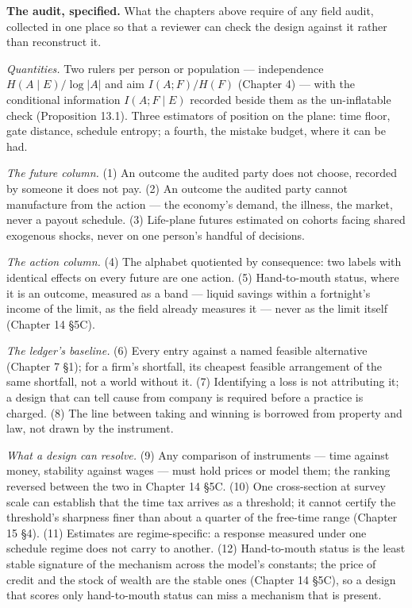 \begin{panelmach}

\textbf{The audit, specified.} What the chapters above require of any
field audit, collected in one place so that a reviewer can check the
design against it rather than reconstruct it.

\emph{Quantities.} Two rulers per person or population --- independence
\(H(A \mid E)/\log |A|\) and aim \(I(A;F)/H(F)\) (Chapter 4) --- with the conditional
information \(I(A;F \mid E)\) recorded beside them as the un-inflatable check
(Proposition 13.1). Three estimators of position on the plane: time
floor, gate distance, schedule entropy; a fourth, the mistake budget,
where it can be had.

\emph{The future column.} (1) An outcome the audited party does not choose,
recorded by someone it does not pay. (2) An outcome the audited party
cannot manufacture from the action --- the economy's demand, the
illness, the market, never a payout schedule. (3) Life-plane futures
estimated on cohorts facing shared exogenous shocks, never on one
person's handful of decisions.

\emph{The action column.} (4) The alphabet quotiented by consequence: two
labels with identical effects on every future are one action. (5)
Hand-to-mouth status, where it is an outcome, measured as a band ---
liquid savings within a fortnight's income of the limit, as the field
already measures it --- never as the limit itself (Chapter 14 §5C).

\emph{The ledger's baseline.} (6) Every entry against a named feasible
alternative (Chapter 7 §1); for a firm's shortfall, its cheapest
feasible arrangement of the same shortfall, not a world without it.
(7) Identifying a loss is not attributing it; a design that can tell
cause from company is required before a practice is charged. (8) The
line between taking and winning is borrowed from property and law,
not drawn by the instrument.

\emph{What a design can resolve.} (9) Any comparison of instruments ---
time against money, stability against wages --- must hold prices or
model them; the ranking reversed between the two in Chapter 14 §5C.
(10) One cross-section at survey scale can establish that the time tax
arrives as a threshold; it cannot certify the threshold's sharpness
finer than about a quarter of the free-time range (Chapter 15 §4).
(11) Estimates are regime-specific: a response measured under one
schedule regime does not carry to another. (12) Hand-to-mouth
status is the least stable signature of the mechanism across the
model's constants; the price of credit and the stock of wealth are
the stable ones (Chapter 14 §5C), so a design that scores only
hand-to-mouth status can miss a mechanism that is present.

\end{panelmach}

